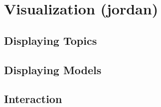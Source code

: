 

\chapter{Visualization (jordan)}
\label{ch:viz}

\section{Displaying Topics}

\section{Displaying Models}

\section{Interaction}